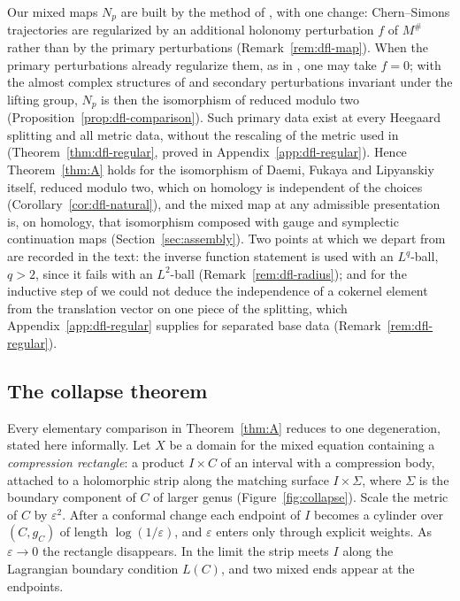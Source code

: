 \documentclass[11pt]{amsart}
\theoremstyle{definition}
\theoremstyle{remark}
\theoremstyle{plain}
\numberwithin{equation}{section}
\newcommand{\eps}{\varepsilon}
\begin{document}
Our mixed maps $N_p$ are built by the method of \cite{DFL}, with one change:
Chern--Simons trajectories are regularized by an additional holonomy perturbation $f$ of
$M^\#$ rather than by the primary perturbations (Remark~\ref{rem:dfl-map}). When the primary
perturbations already regularize them, as in \cite[Lemma~2.56]{DFL}, one may take $f=0$;
with the almost complex structures of \cite{DFL} and secondary perturbations invariant
under the lifting group, $N_p$ is then the isomorphism of \cite[Theorem~3.29]{DFL} reduced
modulo two (Proposition~\ref{prop:dfl-comparison}). Such primary data exist at every Heegaard
splitting and all metric data, without the rescaling of the metric used in
\cite[Proposition~6.8]{DFL} (Theorem~\ref{thm:dfl-regular}, proved in
Appendix~\ref{app:dfl-regular}). Hence Theorem~\ref{thm:A} holds for the isomorphism of
Daemi, Fukaya and Lipyanskiy itself, reduced modulo two, which on homology is independent
of the choices (Corollary~\ref{cor:dfl-natural}), and the mixed map at any admissible
presentation is, on homology, that isomorphism composed with gauge and symplectic
continuation maps (Section~\ref{sec:assembly}). Two points at which we depart from
\cite{DFL} are recorded in the text: the inverse function statement
\cite[Lemma~4.1(iii)]{DFL} is used with an $L^q$-ball, $q>2$, since it fails with an
$L^2$-ball (Remark~\ref{rem:dfl-radius}); and for the inductive step of
\cite[Proposition~6.8]{DFL} we could not deduce the independence of a cokernel element from
the translation vector on one piece of the splitting, which Appendix~\ref{app:dfl-regular}
supplies for separated base data (Remark~\ref{rem:dfl-regular}).

\subsection{The collapse theorem}

Every elementary comparison in Theorem~\ref{thm:A} reduces to one
degeneration, stated here informally. Let $X$ be a domain for the mixed
equation containing a \emph{compression rectangle}: a product
$I\times C$ of an interval with a compression body, attached to a
holomorphic strip along the matching surface $I\times\Sigma$, where $\Sigma$ is the
boundary component of $C$ of larger genus (Figure~\ref{fig:collapse}). Scale
the metric of $C$ by $\eps^2$. After a conformal change each endpoint of
$I$ becomes a cylinder over $(C,g_C)$ of length $\log(1/\eps)$, and
$\eps$ enters only through explicit weights. As $\eps\to0$ the rectangle
disappears. In the limit the strip meets $I$ along the Lagrangian
boundary condition $L(C)$, and two mixed ends appear at the endpoints.
\end{document}
